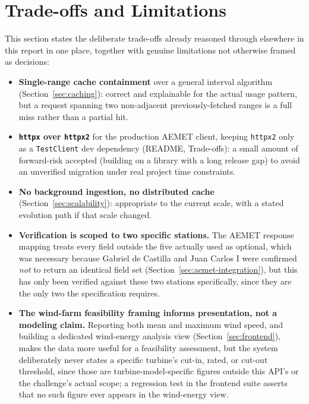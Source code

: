 \documentclass[11pt,a4paper]{article}
\begin{document}
\section{Trade-offs and Limitations}
\label{sec:tradeoffs}

This section states the deliberate trade-offs already reasoned through
elsewhere in this report in one place, together with genuine limitations
not otherwise framed as decisions:

\begin{itemize}[nosep]
    \item \textbf{Single-range cache containment} over a general interval
    algorithm (Section~\ref{sec:caching}): correct and explainable for the
    actual usage pattern, but a request spanning two non-adjacent
    previously-fetched ranges is a full miss rather than a partial hit.
    \item \textbf{\texttt{httpx} over \texttt{httpx2}} for the production
    AEMET client, keeping \texttt{httpx2} only as a \texttt{TestClient}
    dev dependency (README, Trade-offs): a small amount of forward-risk
    accepted (building on a library with a long release gap) to avoid an
    unverified migration under real project time constraints.
    \item \textbf{No background ingestion, no distributed cache}
    (Section~\ref{sec:scalability}): appropriate to the current scale,
    with a stated evolution path if that scale changed.
    \item \textbf{Verification is scoped to two specific stations.} The
    AEMET response mapping treats every field outside the five actually
    used as optional, which was necessary because Gabriel de Castilla and
    Juan Carlos I were confirmed \emph{not} to return an identical field
    set (Section~\ref{sec:aemet-integration}), but this has only been
    verified against these two stations specifically, since they are the
    only two the specification requires.
    \item \textbf{The wind-farm feasibility framing informs presentation,
    not a modeling claim.} Reporting both mean and maximum wind speed,
    and building a dedicated wind-energy analysis view
    (Section~\ref{sec:frontend}), makes the data more useful for a
    feasibility assessment, but the system deliberately never states a
    specific turbine's cut-in, rated, or cut-out threshold, since those
    are turbine-model-specific figures outside this API's or the
    challenge's actual scope; a regression test in the frontend suite
    asserts that no such figure ever appears in the wind-energy view.
\end{itemize}
\end{document}
